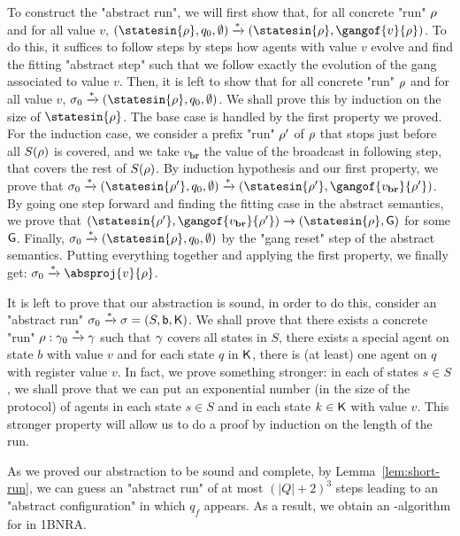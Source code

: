 To construct the "abstract run", we will first show that, for all concrete "run" $\rho$ and for all value $v$, $(\statesin{\run}, q_0, \emptyset) \step{\ast}(\statesin{\run}, \gangof{v}{\run})$. To do this, it suffices to follow steps by steps how agents with value $v$ evolve and find the fitting "abstract step" such that we follow exactly the evolution of the gang associated to value $v$. 
Then, it is left to show that for all concrete "run" $\rho$ and for all value $v$, $\aconfiginit \step{\ast} (\statesin{\run}, q_0, \emptyset)$. We shall prove this by induction on the size of $\statesin{\run}$. The base case is handled by the first property we proved. For the induction case, we consider a prefix "run" $\rho'$ of $\rho$ that stops just before all $S(\rho)$ is covered, and we take $v_{\mathbf{br}}$ the value of the broadcast in following step, that covers the rest of $S(\rho)$. By induction hypothesis and our first property, we prove that $\aconfiginit \step{\ast} (\statesin{\run'}, q_0, \emptyset) \step{\ast} (\statesin{\run'}, \gangof{v_{\mathbf{br}}}{\run'})$. By going one step forward and finding the fitting case in the abstract semantics, we prove that $(\statesin{\run'}, \gangof{v_{\mathbf{br}}}{\run'}) \step{} (\statesin{\run}, \gang)$ for some $\mathsf{G}$. Finally,  $\aconfiginit \step{\ast} (\statesin{\run}, q_0, \emptyset)$ by the "gang reset" step of the abstract semantics. Putting everything together and applying the first property, we finally get: $\aconfiginit \step{\ast} \absproj{v}{\run}$.

It is left to prove that our abstraction is sound, in order to do this, consider an "abstract run" $\sigma_0 \xrightarrow{\ast} \sigma = (S, \mathsf{b}, \mathsf{K})$. We shall prove that there exists a concrete "run" $\rho : \gamma_0 \xrightarrow{\ast} \gamma $ such that $\gamma$ covers all states in $S$, there exists a special agent on state $b$ with value $v$ and for each state $q$ in $\mathsf{K}$, there is (at least) one agent on $q$ with register value $v$. In fact, we prove something stronger: in each of states $s\in S$, we shall prove that we can put an exponential number (in the size of the protocol) of agents in each state $s\in S$ and in each state $k\in \mathsf{K}$ with value $v$. This stronger property will allow us to do a proof by induction on the length of the run. 

As we proved our abstraction to be sound and complete, by Lemma~\ref{lem:short-run}, we can guess an "abstract run" of at most $(|Q| + 2)^3$ steps leading to an "abstract configuration" in which $q_f$ appears. As a result, we obtain an \NP-algorithm for \COVER in 1BNRA.



